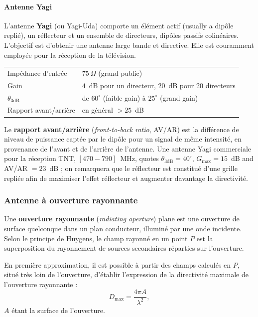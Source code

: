 \paragraph{Antenne Yagi} L'antenne \textbf{Yagi} (ou Yagi-Uda) comporte un
élément actif (usually a dipôle replié), un réflecteur et un ensemble de
directeurs, dipôles passifs colinéaires. L'objectif est d'obtenir une antenne
large bande et directive. Elle est couramment employée pour la réception de la
télévision.

\begin{center}
  \begin{tabular}{@{}ll@{}}
    \toprule
    Impédance d'entrée & $75\ \Omega$ (grand public) \\
    Gain & $4$~dB pour un directeur, $20$~dB pour 20 directeurs \\
    $\theta_{3\mathrm{dB}}$ & de $60^\circ$ (faible gain) à $25^\circ$ (grand gain) \\
    Rapport avant/arrière & en général $> 25$~dB \\
    \bottomrule
  \end{tabular}
\end{center}

Le \textbf{rapport avant/arrière} (\textit{front-to-back ratio}, AV/AR) est la
différence de niveau de puissance captée par le dipôle pour un signal de même
intensité, en provenance de l'avant et de l'arrière de l'antenne. Une antenne
Yagi commerciale pour la réception TNT, $[470 - 790]$~MHz, quotes
$\theta_{3\mathrm{dB}} = 40^\circ$, $G_{\max} = 15$~dB and AV/AR $= 23$~dB ;
on remarquera que le réflecteur est constitué d'une grille repliée afin de
maximiser l'effet réflecteur et augmenter davantage la directivité.

\subsubsection{Antenne à ouverture rayonnante}

Une \textbf{ouverture rayonnante} (\textit{radiating aperture}) plane est une
ouverture de surface quelconque dans un plan conducteur, illuminé par une onde
incidente. Selon le principe de Huygens, le champ rayonné en un point $P$ est
la superposition du rayonnement de sources secondaires réparties sur
l'ouverture.

\begin{prop}
  En première approximation, il est possible à partir des champs calculés en
  $P$, situé très loin de l'ouverture, d'établir l'expression de la directivité
  maximale de l'ouverture rayonnante :
  \[ D_{\max} = \frac{4 \pi A}{\lambda^2}, \]
  $A$ étant la surface de l'ouverture.
\end{prop}

